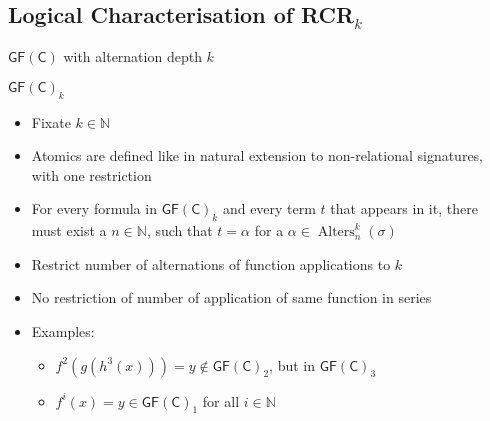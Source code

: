 \documentclass[aspectratio=169]{beamer}
\newcommand{\GFC}{\mathsf{GF}(\mathsf{C})}
\begin{document}
	\subsection{Logical Characterisation of RCR$_k$}
	
	\begin{frame}{$\GFC$ with alternation depth $k$}
		\begin{block}{$\GFC_k$}
			\begin{itemize}
				\item Fixate $k\in\mathbb N$
				\item Atomics are defined like in natural extension to non-relational signatures, with one restriction
				\item For every formula in $\GFC_k$ and every term $t$ that appears in it, there must exist a $n\in\mathbb N$, such that $t=\alpha$ for a $\alpha\in\operatorname{Alters}^k_n(\sigma)$
			\end{itemize}
		\end{block}
		\begin{itemize}
			\item Restrict number of alternations of function applications to $k$
			\item No restriction of number of application of same function in series
			\item Examples:
			\begin{itemize}
				\item $f^2(g(h^3(x)))=y\notin \GFC_2$, but in $\GFC_3$
				\item $f^i(x)=y\in \GFC_1$ for all $i\in \mathbb N$
			\end{itemize}
		\end{itemize}
	\end{frame}
	
	\iffalse
	\begin{frame}{Characterising RCR$_k$ Logically i}
		Hinges on three lemmas:
		\begin{enumerate}
			\item Formula $f^m(x)=y\in \GFC_1$ can be translated to formula in $\GFC_1$ that is equivalent for ~structures with $n$ elements and only $f^i$ with $i\leq n$ appears
			\item Formula $g^m(s(x))=y\in \GFC_d$ can be translated to formula in $\GFC_d$ that is equivalent for structure with $n$ elements and only $f^i$ with $i\leq n$ appears
			\item Formula $R(t_1(x_1),\dots,t_\ell(x_\ell))\in \GFC_d$ can be translated to formula in $\GFC_d$ that is equivalent for structure with $n$ elements and only $f^i$ with $i\leq n$ appears
		\end{enumerate}
	\end{frame}
	\fi
	
\end{document}

